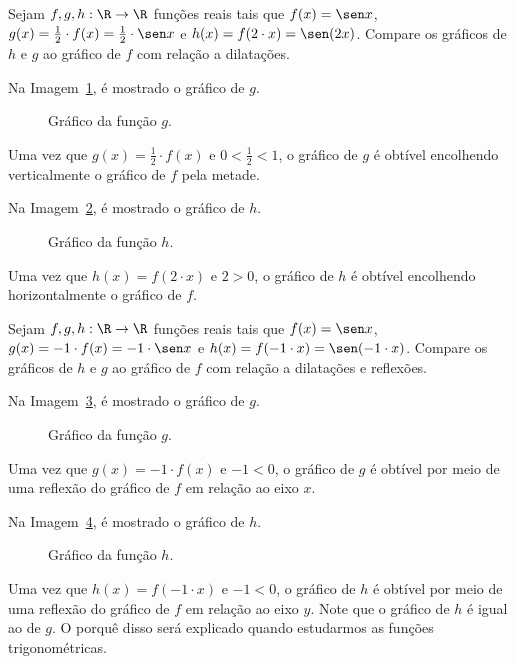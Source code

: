 \begin{example}
  Sejam $f, g , h: \R \to \R$ funções reais tais que $f(x) = \sen x$, $g(x) = \frac 1 2 \cdot f(x)  = \frac 1 2 \cdot \sen x $ e $h(x)= f(2 \cdot x)= \sen (2x)$.
  Compare os gráficos de $h$ e $g$ ao gráfico de $f$ com relação a dilatações.
\end{example}

\begin{solution}
Na Imagem~\ref{img:dilatacao-exemplo1-g}, é mostrado o gráfico de $g$.
  \begin{figure}
    \centering
    
    \caption{Gráfico da função $g$.}
    \label{img:dilatacao-exemplo1-g}
  \end{figure}
\noindent Uma vez que $g(x) = \frac 1 2 \cdot f(x)$ e $0 < \frac 1 2 < 1$, o gráfico de $g$ é obtível encolhendo verticalmente o gráfico de $f$ pela metade.

Na Imagem~\ref{img:dilatacao-exemplo1-h}, é mostrado o gráfico de $h$.
%
  \begin{figure}
    \centering
    
    \caption{Gráfico da função $h$.}
    \label{img:dilatacao-exemplo1-h}
  \end{figure}
\noindent Uma vez que $h(x) = f(2 \cdot x)$ e $2>0$, o gráfico de $h$ é obtível encolhendo horizontalmente o gráfico de $f$.
\end{solution}

\begin{example}
Sejam $f, g , h: \R \to \R$ funções reais tais que $f(x) = \sen x$, $g(x) = -1 \cdot f(x)  = -1 \cdot \sen x $ e $h(x)= f(-1 \cdot x)= \sen (-1 \cdot x)$.
Compare os gráficos de $h$ e $g$ ao gráfico de $f$ com relação a dilatações e reflexões.
\end{example}

\begin{solution}
Na Imagem~\ref{img:dilatacao-exemplo2-g}, é mostrado o gráfico de $g$.
%
  \begin{figure}
    \centering
    
    \caption{Gráfico da função $g$.}
    \label{img:dilatacao-exemplo2-g}
  \end{figure}
%
\noindent Uma vez que $g(x) = -1 \cdot f(x)$ e $-1 < 0$, o gráfico de $g$ é obtível por meio de uma reflexão do gráfico de $f$ em relação ao eixo $x$.

Na Imagem~\ref{img:dilatacao-exemplo2-h}, é mostrado o gráfico de $h$.
%
  \begin{figure}
    \centering
    
    \caption{Gráfico da função $h$.}
    \label{img:dilatacao-exemplo2-h}
  \end{figure}
\noindent Uma vez que $h(x)= f(-1 \cdot x)$ e $-1 < 0$, o gráfico de $h$ é obtível por meio de uma reflexão do gráfico de $f$ em relação ao eixo $y$.
Note que o gráfico de $h$ é igual ao de $g$. 
O porquê disso será explicado quando estudarmos as funções trigonométricas.
\end{solution}


